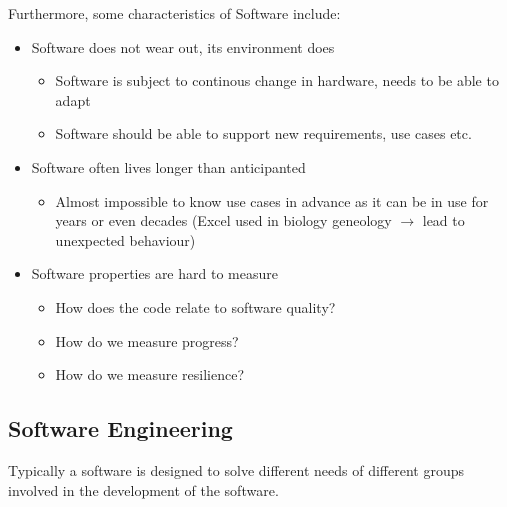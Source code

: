 \documentclass[
../../Software_Engineering_Summary.tex,
]
{subfiles}
\begin{document}
Furthermore, some characteristics of Software include:

\begin{greenbox*}
    \begin{itemize}
        \item Software does not wear out, its environment does
        \begin{itemize}
            \item Software is subject to continous change in hardware, needs to be able to adapt
            \item Software should be able to support new requirements, use cases etc.
        \end{itemize}
        \item Software often lives longer than anticipanted
        \begin{itemize}
            \item Almost impossible to know use cases in advance as it can be in use for years or even decades (Excel used in biology geneology $\rightarrow$ lead to unexpected behaviour)
        \end{itemize}
        \item Software properties are hard to measure
        \begin{itemize}
            \item How does the code relate to software quality?
            \item How do we measure progress?
            \item How do we measure resilience?
        \end{itemize}
    \end{itemize}
\end{greenbox*}
\newpage
\subsection{Software Engineering}
Typically a software is designed to solve different needs of different groups involved in the development of the software.
\end{document}
